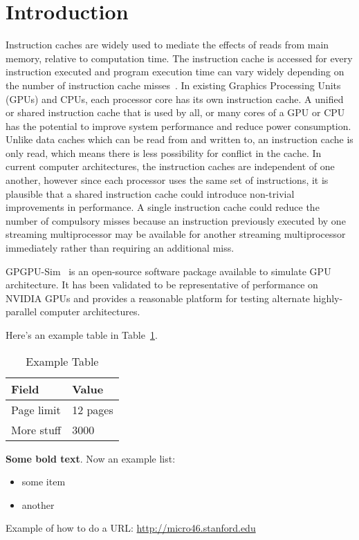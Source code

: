 \section{Introduction}


Instruction caches are widely used to mediate the effects of reads from main memory, relative to computation time. 
The instruction cache is accessed for every instruction executed and program execution time can vary widely depending on the number of instruction cache misses~\cite{arnold94}. 
In existing Graphics Processing Units (GPUs) and CPUs, each processor core has its own instruction cache. 
A unified or shared instruction cache that is used by all, or many cores of a GPU or CPU has the potential to improve system performance and reduce power consumption. 
Unlike data caches which can be read from and written to, an instruction cache is only read, which means there is less possibility for conflict in the cache.
In current computer architectures, the instruction caches are independent of one another, however since each processor uses the same set of instructions, it is plausible that a shared instruction cache could introduce non-trivial improvements in performance. 
A single instruction cache could reduce the number of compulsory misses because an instruction previously executed by one streaming multiprocessor may be available for another streaming multiprocessor immediately rather than requiring an additional miss. 

GPGPU-Sim~\cite{bakhodayuan09} is an open-source software package available to simulate GPU architecture. 
It has been validated to be representative of performance on NVIDIA GPUs and provides a reasonable platform for testing alternate highly-parallel computer architectures.


Here's an example table in Table~\ref{table:example}.

\begin{table}[h!]
  \centering
  \begin{tabular}{|l|l|}
    \hline
    \textbf{Field} & \textbf{Value}\\
    \hline
    \hline
    Page limit & 12 pages\\
    More stuff & 3000\\
  \end{tabular}
  \caption{Example Table}
  \label{table:example}
\end{table}

\textbf{Some bold text}. Now an example list:

\begin{itemize}
\item some item
\item another
\end{itemize}


Example of how to do a URL: \href{http://micro46.stanford.edu}{http://micro46.stanford.edu}

